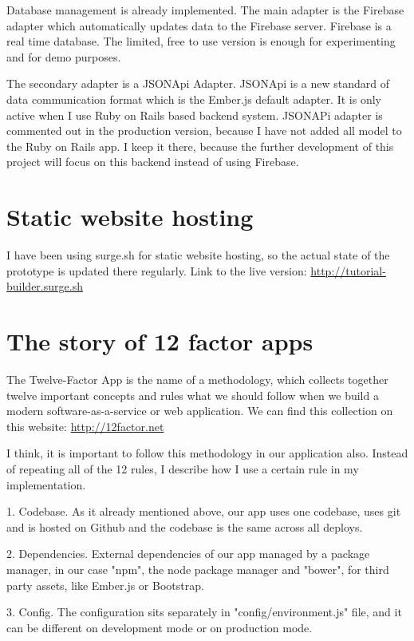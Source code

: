 \documentclass[12pt, a4paper, oneside, openright, medskipamount]{report}
\begin{document}
Database management is already implemented. The main adapter is the Firebase adapter which automatically updates data to the Firebase server. Firebase is a real time database. The limited, free to use version is enough for experimenting and for demo purposes.

The secondary adapter is a JSONApi Adapter. JSONApi \cite{jsonapi} is a new standard of data communication format which is the Ember.js default adapter. It is only active when I use Ruby on Rails based backend system. JSONAPi adapter is commented out in the production version, because I have not added all model to the Ruby on Rails app. I keep it there, because the further development of this project will focus on this backend instead of using Firebase.

\section{Static website hosting}

I have been using surge.sh \cite{surge} for static website hosting, so the actual state of the prototype is updated there regularly. Link to the live version: \url{http://tutorial-builder.surge.sh}

\section{The story of 12 factor apps}

The Twelve-Factor App is the name of a methodology, which collects together twelve important concepts and rules what we should follow when we build a modern software-as-a-service or web application. We can find this collection on this website: \url{http://12factor.net}

I think, it is important to follow this methodology in our application also. Instead of repeating all of the 12 rules, I describe how I use a certain rule in my implementation.

1. Codebase. As it already mentioned above, our app uses one codebase, uses git and is hosted on Github and the codebase is the same across all deploys.

2. Dependencies. External dependencies of our app managed by a package manager, in our case "npm", the node package manager and "bower", for third party assets, like Ember.js or Bootstrap.

3. Config. The configuration sits separately in "config/environment.js" file, and it can be different on development mode or on production mode.
\end{document}
